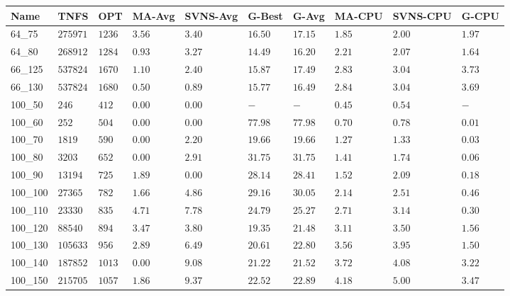 \begin{center}
\begin{table}[]
\centering
\begin{tabular}{|lll|l|l|ll|lll|}
\hline
Name     & TNFS        & OPT    & MA-Avg & SVNS-Avg & G-Best & G-Avg & MA-CPU & SVNS-CPU & G-CPU \\
\hline
64\_75   & $275971   $ & $1236$ & $3.56$ & $3.40 $  & $16.50$    & $17.15$   & $1.85$ & $2.00$   & $1.97$ \\
64\_80   & $268912   $ & $1284$ & $0.93$ & $3.27 $  & $14.49$    & $16.20$   & $2.21$ & $2.07$   & $1.64$ \\
\hline
66\_125  & $537824   $ & $1670$ & $1.10$ & $2.40 $  & $15.87$    & $17.49$   & $2.83$ & $3.04$   & $3.73$ \\
66\_130  & $537824   $ & $1680$ & $0.50$ & $0.89 $  & $15.77$    & $16.49$   & $2.84$ & $3.04$   & $3.69$ \\
\hline
100\_50  & $246      $ & $412 $ & $\bm{0.00}$ & $\bm{0.00} $  & $-    $    & $-    $   & $0.45$ & $0.54$   & $-   $ \\
100\_60  & $252      $ & $504 $ & $\bm{0.00}$ & $\bm{0.00} $  & $77.98$    & $77.98$   & $0.70$ & $0.78$   & $0.01$ \\
100\_70  & $1819     $ & $590 $ & $\bm{0.00}$ & $2.20 $  & $19.66$    & $19.66$   & $1.27$ & $1.33$   & $0.03$ \\
100\_80  & $3203     $ & $652 $ & $\bm{0.00}$ & $2.91 $  & $31.75$    & $31.75$   & $1.41$ & $1.74$   & $0.06$ \\
100\_90  & $13194    $ & $725 $ & $1.89$ & $\bm{0.00} $  & $28.14$    & $28.41$   & $1.52$ & $2.09$   & $0.18$ \\
100\_100 & $27365    $ & $782 $ & $1.66$ & $4.86 $  & $29.16$    & $30.05$   & $2.14$ & $2.51$   & $0.46$ \\
100\_110 & $23330    $ & $835 $ & $4.71$ & $7.78 $  & $24.79$    & $25.27$   & $2.71$ & $3.14$   & $0.30$ \\
100\_120 & $88540    $ & $894 $ & $3.47$ & $3.80 $  & $19.35$    & $21.48$   & $3.11$ & $3.50$   & $1.56$ \\
100\_130 & $105633   $ & $956 $ & $2.89$ & $6.49 $  & $20.61$    & $22.80$   & $3.56$ & $3.95$   & $1.50$ \\
100\_140 & $187852   $ & $1013$ & $\bm{0.00}$ & $9.08 $  & $21.22$    & $21.52$   & $3.72$ & $4.08$   & $3.22$ \\
100\_150 & $215705   $ & $1057$ & $1.86$ & $9.37 $  & $22.52$    & $22.89$   & $4.18$ & $5.00$   & $3.47$ \\

\end{tabular}
\end{table}
\end{center}
